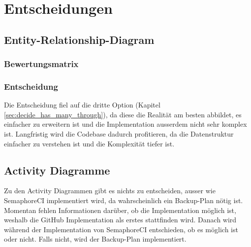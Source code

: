 \section{Entscheidungen}
\begin{minipage}{\textwidth}
    \subsection{Entity-Relationship-Diagram}
    \label{sec:decide_erd}
    \subsubsection{Bewertungsmatrix}
    \begin{center}
    \end{center}
    \subsubsection{Entscheidung}
    Die Entscheidung fiel auf die dritte Option (Kapitel \ref{sec:decide_has_many_through}), da diese die Realität am besten
    abbildet, es einfacher zu erweitern ist und die Implementation ausserdem nicht sehr komplex ist. \newline
    Langfristig wird die Codebase dadurch profitieren, da die Datenstruktur einfacher zu verstehen ist und die Komplexität
    tiefer ist. \newline
\end{minipage}

\begin{minipage}{\textwidth}
    \subsection{Activity Diagramme}
    Zu den Activity Diagrammen gibt es nichts zu entscheiden, ausser wie SemaphoreCI implementiert wird,
    da wahrscheinlich ein Backup-Plan nötig ist. \newline
    Momentan fehlen Informationen darüber, ob die Implementation möglich ist, weshalb die GitHub Implementation als erstes
    stattfinden wird. Danach wird während der Implementation von SemaphoreCI entschieden, ob es möglich ist oder nicht. Falls
    nicht, wird der Backup-Plan implementiert. \newline
\end{minipage}

